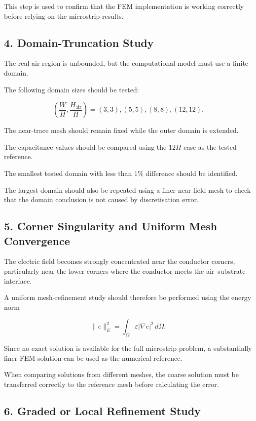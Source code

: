 This step is used to confirm that the FEM implementation is working correctly before relying on the microstrip results.

\subsection*{4. Domain-Truncation Study}

The real air region is unbounded, but the computational model must use a finite domain.

The following domain sizes should be tested:

\[
\left(
\frac{W}{H},
\frac{H_{\mathrm{air}}}{H}
\right)
=
(3,3),
(5,5),
(8,8),
(12,12).
\]

The near-trace mesh should remain fixed while the outer domain is extended.

The capacitance values should be compared using the \(12H\) case as the tested reference.

The smallest tested domain with less than \(1\%\) difference should be identified.

The largest domain should also be repeated using a finer near-field mesh to check that the domain conclusion is not caused by discretisation error.

\subsection*{5. Corner Singularity and Uniform Mesh Convergence}

The electric field becomes strongly concentrated near the conductor corners, particularly near the lower corners where the conductor meets the air--substrate interface.

A uniform mesh-refinement study should therefore be performed using the energy norm

\[
\|e\|_E^2
=
\int_{\Omega}
\varepsilon
\left|
\nabla e
\right|^2
\, d\Omega.
\]

Since no exact solution is available for the full microstrip problem, a substantially finer FEM solution can be used as the numerical reference.

When comparing solutions from different meshes, the coarse solution must be transferred correctly to the reference mesh before calculating the error.

\subsection*{6. Graded or Local Refinement Study}

